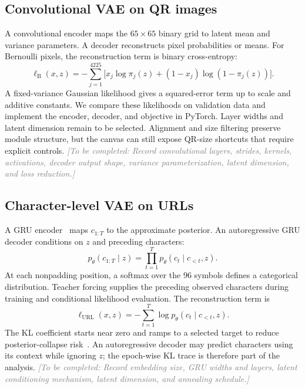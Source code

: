 \documentclass{article}
\newcommand{\pending}[1]{\textcolor{gray}{\textit{[To be completed: #1]}}}
\begin{document}
\subsection{Convolutional VAE on QR images}
A convolutional encoder maps the $65\times65$ binary grid to latent mean and variance parameters.
A decoder reconstructs pixel probabilities or means.
For Bernoulli pixels, the reconstruction term is binary cross-entropy:
\begin{equation}
\ell_{\mathrm{B}}(x,z)
=
-\sum_{j=1}^{4225}
\bigl[
  x_j\log\pi_j(z)
  +
  (1-x_j)\log(1-\pi_j(z))
\bigr].
\end{equation}
A fixed-variance Gaussian likelihood gives a squared-error term up to scale and additive constants.
We compare these likelihoods on validation data and implement the encoder, decoder, and objective in PyTorch.
Layer widths and latent dimension remain to be selected.
Alignment and size filtering preserve module structure, but the canvas can still expose QR-size shortcuts that require explicit controls.
\pending{Record convolutional layers, strides, kernels, activations, decoder output shape, variance parameterization, latent dimension, and loss reduction.}

\subsection{Character-level VAE on URLs}
A GRU encoder~\citep{cho} maps $c_{1:T}$ to the approximate posterior.
An autoregressive GRU decoder conditions on $z$ and preceding characters:
\begin{equation}
p_\theta(c_{1:T}\mid z)=\prod_{t=1}^{T}p_\theta(c_t\mid c_{<t},z).
\end{equation}
At each nonpadding position, a softmax over the 96 symbols defines a categorical distribution.
Teacher forcing supplies the preceding observed characters during training and conditional likelihood evaluation.
The reconstruction term is
\begin{equation}
\ell_{\mathrm{URL}}(x,z)=-\sum_{t=1}^{T}\log p_\theta(c_t\mid c_{<t},z).
\end{equation}
The KL coefficient starts near zero and ramps to a selected target to reduce posterior-collapse risk~\citep{bowman}.
An autoregressive decoder may predict characters using its context while ignoring $z$; the epoch-wise KL trace is therefore part of the analysis.
\pending{Record embedding size, GRU widths and layers, latent conditioning mechanism, latent dimension, and annealing schedule.}
\end{document}
